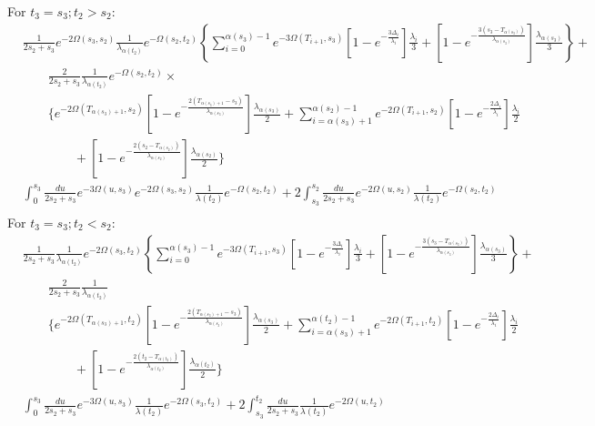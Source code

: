 \documentclass{article}
\begin{document}
For $t_3=s_3;t_2>s_2$:
\begin{align*}
    &\frac{1}{2s_2+s_3}e^{-2\Omega(s_3,s_2)}\frac{1}{\lambda_{\alpha(t_2)}}e^{-\Omega(s_2,t_2)}
    \left\{\sum_{i=0}^{\alpha(s_3)-1}e^{-3\Omega(T_{i+1},s_3)}
        \left[1-e^{-\frac{3\Delta_i}{\lambda_i}}\right]\frac{\lambda_i}{3}+
    \left[1-e^{-\frac{3\left(s_3-T_{\alpha(s_3)}\right)}{\lambda_{\alpha(s_3)}}}\right]
        \frac{\lambda_{\alpha(s_3)}}{3}\right\}+\\
    &\qquad\frac{2}{2s_2+s_3}\frac{1}{\lambda_{\alpha(t_2)}}e^{-\Omega(s_2,t_2)}\times\\
    &\qquad\Bigg\{e^{-2\Omega(T_{\alpha(s_3)+1},s_2)}\left[1-e^{-\frac{2\left(T_{\alpha(s_3)+1}-s_3\right)}{\lambda_{\alpha(s_3)}}}\right]\frac{\lambda_{\alpha(s_3)}}{2}+\sum_{i=\alpha(s_3)+1}^{\alpha(s_2)-1}e^{-2\Omega\left(T_{i+1},s_2\right)}\left[1-e^{-\frac{2\Delta_i}{\lambda_i}}\right]\frac{\lambda_i}{2}\\
    &\qquad\qquad+\left[1-e^{-\frac{2\left(s_2-T_{\alpha(s_2)}\right)}{\lambda_{\alpha(s_2)}}}\right]\frac{\lambda_{\alpha(s_2)}}{2}
    \Bigg\}
    \\
    &\int_0^{s_3}\frac{du}{2s_2+s_3}e^{-3\Omega(u,s_3)}e^{-2\Omega(s_3,s_2)}\frac{1}{\lambda(t_2)}e^{-\Omega(s_2,t_2)}+
    2\int_{s_3}^{s_2}\frac{du}{2s_2+s_3}e^{-2\Omega(u,s_2)}\frac{1}{\lambda(t_2)}e^{-\Omega(s_2,t_2)}\\
\end{align*}
For $t_3=s_3; t_2<s_2$:
\begin{align*}
    &\frac{1}{2s_2+s_3}\frac{1}{\lambda_{\alpha(t_2)}}e^{-2\Omega(s_3,t_2)}
    \left\{\sum_{i=0}^{\alpha(s_3)-1}e^{-3\Omega(T_{i+1},s_3)}
        \left[1-e^{-\frac{3\Delta_i}{\lambda_i}}\right]\frac{\lambda_i}{3}+
    \left[1-e^{-\frac{3\left(s_3-T_{\alpha(s_3)}\right)}{\lambda_{\alpha(s_3)}}}\right]
        \frac{\lambda_{\alpha(s_3)}}{3}\right\}+\\
        &\qquad\frac{2}{2s_2+s_3}\frac{1}{\lambda_{\alpha(t_2)}}\\
    &\qquad\Bigg\{e^{-2\Omega(T_{\alpha(s_3)+1},t_2)}\left[1-e^{-\frac{2\left(T_{\alpha(s_3)+1}-s_3\right)}{\lambda_{\alpha(s_3)}}}\right]\frac{\lambda_{\alpha(s_3)}}{2}+\sum_{i=\alpha(s_3)+1}^{\alpha(t_2)-1}e^{-2\Omega\left(T_{i+1},t_2\right)}\left[1-e^{-\frac{2\Delta_i}{\lambda_i}}\right]\frac{\lambda_i}{2}\\
    &\qquad\qquad+\left[1-e^{-\frac{2\left(t_2-T_{\alpha(t_2)}\right)}{\lambda_{\alpha(t_2)}}}\right]\frac{\lambda_{\alpha(t_2)}}{2}
    \Bigg\}\\
    &\int_0^{s_3}\frac{du}{2s_2+s_3}e^{-3\Omega(u,s_3)}\frac{1}{\lambda(t_2)}e^{-2\Omega(s_3,t_2)}+
    2\int_{s_3}^{t_2}\frac{du}{2s_2+s_3}\frac{1}{\lambda(t_2)}e^{-2\Omega(u,t_2)}\\
\end{align*}
\end{document}
